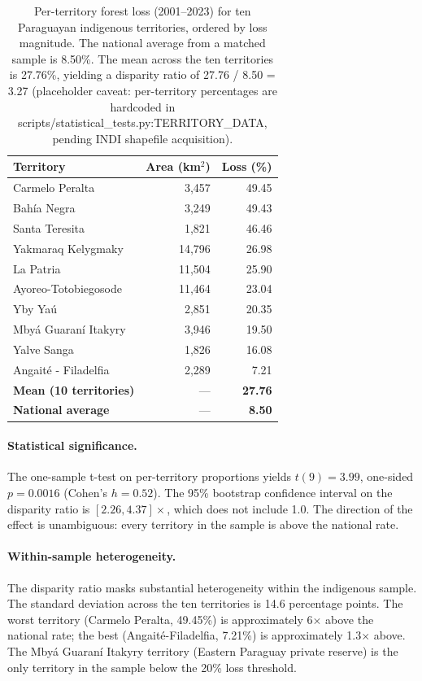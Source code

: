 \begin{table}[h]
\centering
\caption{Per-territory forest loss (2001--2023) for ten Paraguayan
indigenous territories, ordered by loss magnitude. The national
average from a matched sample is 8.50\%. The mean across the ten
territories is 27.76\%, yielding a disparity ratio of 27.76 / 8.50
= 3.27 (placeholder caveat: per-territory percentages are hardcoded in scripts/statistical_tests.py:TERRITORY_DATA, pending INDI shapefile acquisition).}
\label{tab:yvy-territories}
\begin{tabular}{lrr}
\toprule
Territory & Area (km$^2$) & Loss (\%) \\
\midrule
Carmelo Peralta     & 3{,}457  & 49.45 \\
Bah\'ia Negra       & 3{,}249  & 49.43 \\
Santa Teresita      & 1{,}821  & 46.46 \\
Yakmaraq Kelygmaky  & 14{,}796 & 26.98 \\
La Patria           & 11{,}504 & 25.90 \\
Ayoreo-Totobiegosode & 11{,}464 & 23.04 \\
Yby Ya\'u            & 2{,}851  & 20.35 \\
Mby\'a Guaran\'i Itakyry & 3{,}946  & 19.50 \\
Yalve Sanga         & 1{,}826  & 16.08 \\
Angait\'e - Filadelfia & 2{,}289  & 7.21 \\
\midrule
\textbf{Mean (10 territories)} & --- & \textbf{27.76} \\
\textbf{National average}       & --- & \textbf{8.50} \\
\bottomrule
\end{tabular}
\end{table}

\paragraph{Statistical significance.} The one-sample t-test on per-territory proportions yields
$t(9) = 3.99$, one-sided $p = 0.0016$ (Cohen's $h = 0.52$). The 95\%
bootstrap confidence interval on the disparity ratio is
$[2.26, 4.37]\times$, which does not include 1.0. The direction of the
effect is unambiguous: every territory in the sample is above the
national rate.

\paragraph{Within-sample heterogeneity.} The disparity ratio masks
substantial heterogeneity within the indigenous sample. The standard
deviation across the ten territories is 14.6 percentage points. The
worst territory (Carmelo Peralta, 49.45\%) is approximately 6$\times$
above the national rate; the best (Angait\'e-Filadelfia, 7.21\%) is
approximately 1.3$\times$ above. The Mby\'a Guaran\'i Itakyry
territory (Eastern Paraguay private reserve) is the only territory in
the sample below the 20\% loss threshold.

